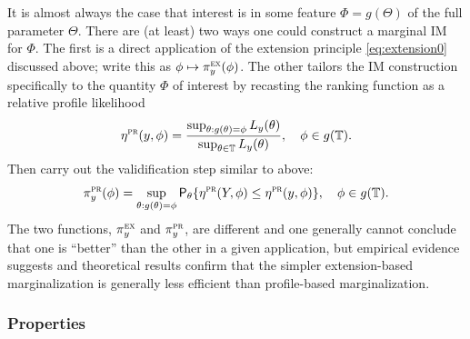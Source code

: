 \documentclass[12pt]{article}
\def\TT{\mathbb{T}}
\def\prob{\mathsf{P}}
\begin{document}
It is almost always the case that interest is in some feature $\Phi=g(\Theta)$ of the full parameter $\Theta$.  There are (at least) two ways one could construct a marginal IM for $\Phi$.  The first is a direct application of the extension principle \eqref{eq:extension0} discussed above; write this as $\phi \mapsto \pi_y^\text{\sc ex}(\phi)$.  The other tailors the IM construction specifically to the quantity $\Phi$ of interest by recasting the ranking function as a relative profile likelihood 
\begin{equation}
\label{eq:relproflik}
\eta^\text{\sc pr}(y,\phi) = \frac{\sup_{\theta: g(\theta)=\phi} L_y(\theta)}{\sup_{\theta \in \TT} L_y(\theta)}, \quad \phi \in g(\TT). 
\end{equation}
Then carry out the validification step similar to above:
\[ \pi_y^\text{\sc pr}(\phi) = \sup_{\theta: g(\theta) = \phi} \prob_\theta\{ \eta^\text{\sc pr}(Y,\phi) \leq \eta^\text{\sc pr}(y,\phi) \}, \quad \phi \in g(\TT). \]
The two functions, $\pi_y^\text{\sc ex}$ and $\pi_y^\text{\sc pr}$, are different and one generally cannot conclude that one is ``better'' than the other in a given application, but empirical evidence suggests \citep{martin2023valid3} and theoretical results confirm \citep{imbvm.ext} that the simpler extension-based marginalization is generally less efficient than profile-based marginalization. 




\subsubsection{Properties}
\label{SSS:im.vac.properties}
\end{document}

